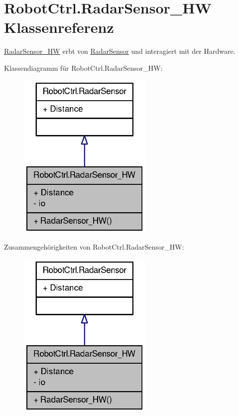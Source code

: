 \hypertarget{class_robot_ctrl_1_1_radar_sensor___h_w}{
\section{RobotCtrl.RadarSensor\_\-HW Klassenreferenz}
\label{class_robot_ctrl_1_1_radar_sensor___h_w}
}


\hyperlink{class_robot_ctrl_1_1_radar_sensor___h_w}{RadarSensor\_\-HW} erbt von \hyperlink{class_robot_ctrl_1_1_radar_sensor}{RadarSensor} und interagiert mit der Hardware.  




Klassendiagramm für RobotCtrl.RadarSensor\_\-HW:\nopagebreak
\begin{figure}[H]
\begin{center}
\leavevmode
\includegraphics[width=182pt]{class_robot_ctrl_1_1_radar_sensor___h_w__inherit__graph}
\end{center}
\end{figure}


Zusammengehörigkeiten von RobotCtrl.RadarSensor\_\-HW:\nopagebreak
\begin{figure}[H]
\begin{center}
\leavevmode
\includegraphics[width=182pt]{class_robot_ctrl_1_1_radar_sensor___h_w__coll__graph}
\end{center}
\end{figure}

